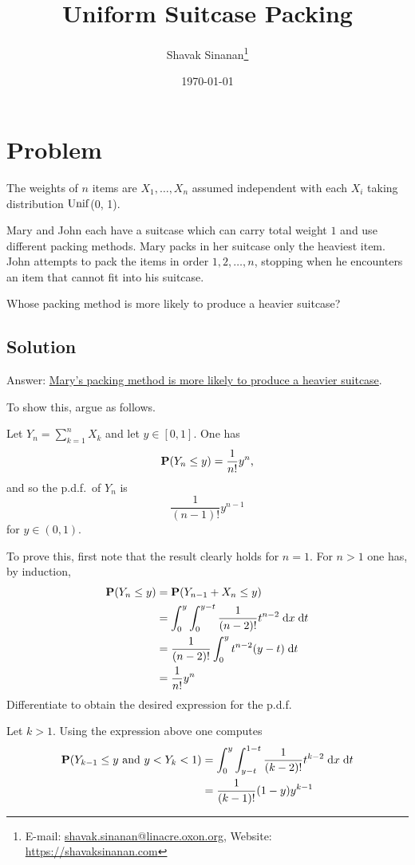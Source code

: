 \documentclass[british,a4paper]{article}
\title{Uniform Suitcase Packing}
\author{Shavak Sinanan\thanks{E-mail: \href{mailto:shavak.sinanan@linacre.oxon.org}{shavak.sinanan@linacre.oxon.org}, Website: \url{https://shavaksinanan.com}}}
\date{\today}
\begin{document}
\maketitle

\section{Problem}\label{sec:problem-A}
The weights of \(n\) items are \(X_1, \dotsc, X_n\) assumed independent with each \(X_i\) taking distribution \(\operatorname{Unif}\)(0, 1).

Mary and John each have a suitcase which can carry total weight \(1\) and use different packing methods. Mary packs in her suitcase only the heaviest item. John attempts to pack the items in order \(1, 2, \dotsc, n\), stopping when he encounters an item that cannot fit into his suitcase.

Whose packing method is more likely to produce a heavier suitcase?

\subsection*{Solution}

Answer: \uline{Mary's packing method is more likely to produce a heavier suitcase}.

To show this, argue as follows.

Let \(Y_n = \sum_{k = 1}^n X_k\) and let \(y \in [0, 1]\). One has
\[
\operatorname{\mathbf{P}}(Y_n \leq y) = \frac{1}{n!}y^n\text{,}
\]
and so the p.d.f.\ of \(Y_n\) is
\[
\frac{1}{(n - 1)!}y^{n - 1}
\]
for \(y \in (0, 1)\).

To prove this, first note that the result clearly holds for \(n = 1\). For \(n > 1\) one has, by induction,
\begin{equation*}
    \begin{split}
        \operatorname{\mathbf{P}}(Y_n \leq y) &= \operatorname{\mathbf{P}}(Y_{n - 1} + X_n \leq y)\\
        &= \int_0^y\int_0^{y - t} \frac{1}{(n - 2)!}t^{n - 2} \;\mathrm{d} x \;\mathrm{d} t\\
        &= \frac{1}{(n - 2)!} \int_0^y t^{n - 2}(y - t) \;\mathrm{d} t\\
        &= \frac{1}{n!}y^n
    \end{split}
\end{equation*}
Differentiate to obtain the desired expression for the p.d.f.

Let \(k > 1\). Using the expression above one computes
\begin{equation*}
    \begin{split}
        \operatorname{\mathbf{P}}(Y_{k - 1} \leq y \text{ and } y < Y_k < 1) &= \int_0^y \int_{y - t}^{1 - t} \frac{1}{(k - 2)!}t^{k - 2} \;\mathrm{d} x \;\mathrm{d} t\\
        &= \frac{1}{(k - 1)!}(1- y)y^{k - 1}
    \end{split}
\end{equation*}
\end{document}
